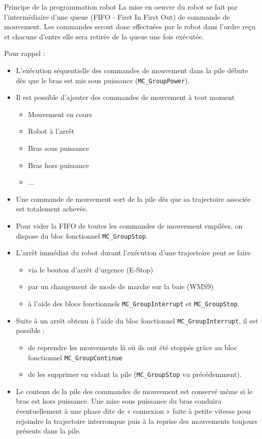 
\begin{UPSTIinfor}{Principe de la programmation robot}
    La mise en oeuvre du robot se fait par l'intermédiaire d'une queue (FIFO - First In First Out) de commande de mouvement. Les commandes seront donc effectuées par le robot dans l'ordre reçu et chacune d'entre elle sera retirée de la queue une fois exécutée. 
    
    Pour rappel : 
    \begin{itemize}
        \item L'exécution séquentielle des commandes de mouvement dans la pile débute dès que le bras est mis sous puissance (\texttt{MC\_GroupPower}).
        \item Il est possible d'ajouter des commandes de mouvement à tout moment 
        \begin{itemize}
            \item Mouvement en cours
            \item Robot à l'arrêt 
            \item Bras sous puissance
            \item Bras hors puissance
            \item ...
        \end{itemize}
        \item Une commande de mouvement sort de la pile dès que sa trajectoire associée est totalement achevée.
        \item Pour vider la FIFO de toutes les commandes de mouvement empilées, on dispose du bloc fonctionnel \texttt{MC\_GroupStop}.
        \item L'arrêt immédiat du robot durant l'exécution d'une trajectoire peut se faire 
        \begin{itemize}
            \item via le bouton d'arrêt d'urgence (E-Stop)
            \item par un changement de mode de marche sur la baie (WMS9)
            \item à l'aide des blocs fonctionnels \texttt{MC\_GroupInterrupt} et \texttt{MC\_GroupStop}.
        \end{itemize}
        \item Suite à un arrêt obtenu à l'aide du bloc fonctionnel \texttt{MC\_GroupInterrupt}, il est possible : 
        \begin{itemize}
            \item de reprendre les mouvements là où ils ont été stoppés grâce au bloc fonctionnel \texttt{MC\_GroupContinue}
            \item de les supprimer en vidant la pile (\texttt{MC\_GroupStop} vu précédemment).
        \end{itemize} 
        \item Le contenu de la pile des commandes de mouvement est conservé même si le bras est hors puissance. Une mise sous puissance du bras conduira éventuellement à une phase dite de « connexion » faite à petite vitesse pour rejoindre la trajectoire interrompue puis à la reprise des mouvements toujours présents dans la pile.
    \end{itemize}
    
    \end{UPSTIinfor}
    
    
    
